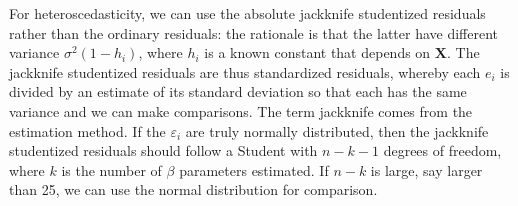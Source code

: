 \documentclass[
]{book}
\newenvironment{Shaded}{\begin{snugshade}}{\end{snugshade}}
\newcommand{\CommentTok}[1]{\textcolor[rgb]{0.56,0.35,0.01}{\textit{#1}}}
\newcommand{\DataTypeTok}[1]{\textcolor[rgb]{0.13,0.29,0.53}{#1}}
\newcommand{\DecValTok}[1]{\textcolor[rgb]{0.00,0.00,0.81}{#1}}
\newcommand{\KeywordTok}[1]{\textcolor[rgb]{0.13,0.29,0.53}{\textbf{#1}}}
\newcommand{\NormalTok}[1]{#1}
\newcommand{\OperatorTok}[1]{\textcolor[rgb]{0.81,0.36,0.00}{\textbf{#1}}}
\newcommand{\OtherTok}[1]{\textcolor[rgb]{0.56,0.35,0.01}{#1}}
\newcommand{\StringTok}[1]{\textcolor[rgb]{0.31,0.60,0.02}{#1}}
\begin{document}
For heteroscedasticity, we can use the absolute jackknife studentized residuals rather than the ordinary residuals: the rationale is that the latter have different variance \(\sigma^2(1-h_i)\), where \(h_i\) is a known constant that depends on \(\mathbf{X}\). The jackknife studentized residuals are thus standardized residuals, whereby each \(e_i\) is divided by an estimate of its standard deviation so that each has the same variance and we can make comparisons. The term jackknife comes from the estimation method. If the \(\varepsilon_i\) are truly normally distributed, then the jackknife studentized residuals should follow a Student with \(n-k-1\) degrees of freedom, where \(k\) is the number of \(\beta\) parameters estimated. If \(n-k\) is large, say larger than 25, we can use the normal distribution for comparison.

\begin{Shaded}
\end{Shaded}
\end{document}
